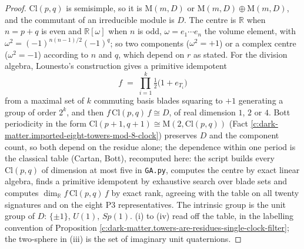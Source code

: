 \documentclass[11pt]{article}
\theoremstyle{definition}
\theoremstyle{plain}
\providecommand{\Cl}{}\renewcommand{\Cl}{\mathrm{Cl}}
\providecommand{\Mat}{}\renewcommand{\Mat}{\mathrm{M}}
\providecommand{\R}{}\renewcommand{\R}{\mathbb{R}}
\begin{document}
\begin{proof}
$\Cl(p,q)$ is semisimple, so it is $\Mat(m, D)$ or $\Mat(m, D) \oplus \Mat(m, D)$, and the commutant of an irreducible module is $D$. The centre is $\R$ when $n = p + q$ is even and $\R[\omega]$ when $n$ is odd, $\omega = e_{1} \cdots e_{n}$ the volume element, with $\omega^{2} = (-1)^{n(n-1)/2}(-1)^{q}$; so two components ($\omega^{2} = +1$) or a complex centre ($\omega^{2} = -1$) according to $n$ and $q$, which depend on $r$ as stated. For the division algebra, Lounesto's construction gives a primitive idempotent
\[
f \;=\; \prod_{i=1}^{k}\tfrac{1}{2}\bigl(1 + e_{T_{i}}\bigr)
\]
from a maximal set of $k$ commuting basis blades squaring to $+1$ generating a group of order $2^{k}$, and then $f\,\Cl(p,q)\,f \cong D$, of real dimension $1$, $2$ or $4$. Bott periodicity in the form $\Cl(p+1, q+1) \cong \Mat(2, \Cl(p,q))$ (Fact \ref{c:dark-matter.imported-eight-towers-mod-8-clock}) preserves $D$ and the component count, so both depend on the residue alone; the dependence within one period is the classical table (Cartan, Bott), recomputed here: the script builds every $\Cl(p,q)$ of dimension at most five in \texttt{GA.py}, computes the centre by exact linear algebra, finds a primitive idempotent by exhaustive search over blade sets and computes $\dim_{\R} f\,\Cl(p,q)\,f$ by exact rank, agreeing with the table on all twenty signatures and on the eight P3 representatives. The intrinsic group is the unit group of $D$: $\{\pm 1\}$, $U(1)$, $Sp(1)$. (i) to (iv) read off the table, in the labelling convention of Proposition \ref{c:dark-matter.towers-are-residues-single-clock-filter}; the two-sphere in (iii) is the set of imaginary unit quaternions.

\end{proof}
\end{document}
